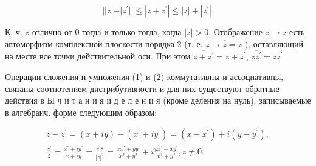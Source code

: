 \documentclass[10pt]{article}
\begin{document}
\[

|| z|-| z^{\prime}|| \leqslant\left|z+z^{\prime}\right| \leqslant|z|+\left|z^{\prime}\right| .

\]



К. ч. $z$ отлично от 0 тогда и только тогда, когда $|z|>0$. Отображение $z \rightarrow \bar{z}$ есть автоморфизм комплексной плоскости порядка 2 (т. е. $\bar{z} \rightarrow \overline{\bar{z}}=z$ ), оставляющий на месте все точки действительной оси. При этом $\overline{z+z^{\prime}}=\bar{z}+\bar{z}^{\prime}$, $\overline{z z^{\prime}}=\bar{z} \bar{z}^{\prime}$



Операции сложения и умножения (1) и (2) коммутативны и ассоциативны, связаны соотнотением дистрибутивности и для них существуют обратные действия в Ы ч и т а н и я и д е л е н и я (кроме деления на нуль), записываемые в алгебраич. форме следующим образом:



\[

\begin{gathered}

z-z^{\prime}=(x+i y)-\left(x^{\prime}+i y^{\prime}\right)=\left(x-x^{\prime}\right)+i\left(y-y^{\prime}\right), \\

\frac{z^{\prime}}{z}=\frac{x^{\prime}+i y^{\prime}}{x+i y}=\frac{z^{\prime} \bar{z}}{|z|^{2}}=\frac{x x^{\prime}+y y^{\prime}}{x^{2}+y^{2}}+i \frac{y x^{\prime}-x y^{\prime}}{x^{2}+y^{2}}, z \neq 0 .

\end{gathered}

\]
\end{document}
